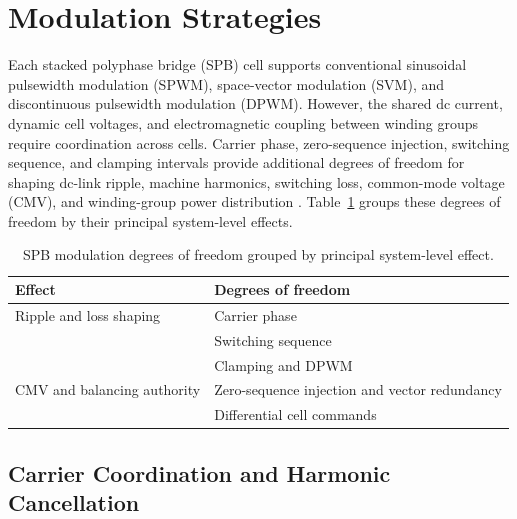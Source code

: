 \section{Modulation Strategies}
\label{sec:modulation}

Each stacked polyphase bridge (SPB) cell supports conventional sinusoidal
pulsewidth modulation (SPWM), space-vector modulation (SVM), and
discontinuous pulsewidth modulation (DPWM). However, the shared dc
current, dynamic cell voltages, and electromagnetic coupling between
winding groups require coordination across cells. Carrier phase,
zero-sequence injection, switching sequence, and clamping intervals
provide additional degrees of freedom for shaping dc-link ripple,
machine harmonics, switching loss, common-mode voltage (CMV), and
winding-group power distribution \cite{Jin2014Control,Jin2017Modulation}.
Table~\ref{fig:spb_modulation_taxonomy} groups these degrees of freedom
by their principal system-level effects.

\begin{table}[!t]
\centering
\caption{SPB modulation degrees of freedom grouped by principal
system-level effect.}
\label{fig:spb_modulation_taxonomy}
\renewcommand{\arraystretch}{1.1}
\setlength{\tabcolsep}{3pt}
\footnotesize
\begin{tabular}{p{2.0cm}p{5.7cm}}
\hline
\textbf{Effect} & \textbf{Degrees of freedom}\\
\hline
Ripple and loss shaping &
Carrier phase \cite{Jin2017Modulation,Verkroost2021Ripple,Hopkins2019DCLinkRipple}\\
 & Switching sequence
\cite{Wang2025HybridPWM,Wang2025PWMHarmonicLoss}\\
 & Clamping and DPWM
\cite{Yang2026HybridOEW,Lee2026AlternatingDPWM}\\
CMV and balancing authority &
Zero-sequence injection and vector redundancy
\cite{Sun2025CMVMPC,Zheng2025MultiObjectivePWM}\\
 & Differential cell commands \cite{Verkroost2024PowerDistribution,Wu2020ActiveBalancing}\\
\hline
\end{tabular}
\end{table}

\subsection{Carrier Coordination and Harmonic Cancellation}

